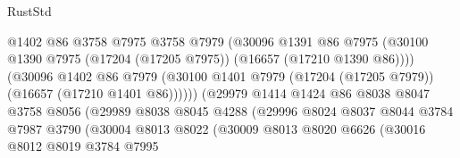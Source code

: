 \begin{lexlean}{RustStd}
\begin{coremodule}
                                      @1402
                                      @86
                                      @3758
                                      @7975
                                      @3758
                                      @7979
                                      (@30096
                                        @1391
                                        @86
                                        @7975
                                        (@30100
                                          @1390
                                          @7975
                                          (@17204 (@17205 @7975))
                                          (@16657 (@17210 @1390 @86))))
                                      (@30096
                                        @1402
                                        @86
                                        @7979
                                        (@30100
                                          @1401
                                          @7979
                                          (@17204 (@17205 @7979))
                                          (@16657 (@17210 @1401 @86))))))
                                  (@29979
                                    @1414
                                    @1424
                                    @86
                                    @8038
                                    @8047
                                    @3758
                                    @8056
                                    (@29989
                                      @8038
                                      @8045
                                      @4288
                                      (@29996
                                        @8024
                                        @8037
                                        @8044
                                        @3784
                                        @7987
                                        @3790
                                        (@30004
                                          @8013
                                          @8022
                                          (@30009
                                            @8013
                                            @8020
                                            @6626
                                            (@30016
                                              @8012
                                              @8019
                                              @3784
                                              @7995

\end{coremodule}
\end{lexlean}
